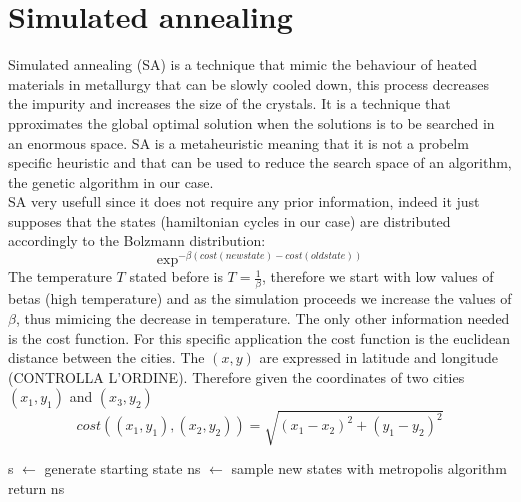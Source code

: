\documentclass{article}
\begin{document}
\section{Simulated annealing}
Simulated annealing (SA) is a technique that mimic the behaviour of heated materials in metallurgy that can be slowly cooled down, this process decreases the impurity and increases the size of the crystals. It is a technique that pproximates the global optimal solution when the solutions is to be searched in an enormous space. SA is a metaheuristic meaning that it is not a probelm specific heuristic and that can be used to reduce the search space of an algorithm, the genetic algorithm in our case.\\
SA very usefull since it does not require any prior information, indeed it just supposes that the states (hamiltonian cycles in our case) are distributed accordingly to the Bolzmann distribution:
\begin{equation}
\exp^{- \beta (cost(new state) - cost(old state))}
\end{equation}
The temperature $T$ stated before is $T = \frac{1}{\beta}$, therefore we start with low values of betas (high temperature) and as the simulation proceeds we increase the values of $\beta$, thus mimicing the decrease in temperature.
The only other information needed is the cost function. For this specific application the cost function is the euclidean distance between the cities. The $(x,y)$ are expressed in latitude and longitude (CONTROLLA L'ORDINE). Therefore given the coordinates of two cities  $(x_1,y_1)$ and $(x_3,y_2)$
\begin{equation}
cost((x_1,y_1),(x_2,y_2)) = \sqrt{(x_1-x_2)^2 + (y_1-y_2)^2}
\end{equation}

\begin{algorithm}[h]
    \begin{algorithmic}[1]
        \State s $\leftarrow$ generate starting state
         	\State ns  $\leftarrow$ sample new states with metropolis algorithm
         	\EndFor
        \EndFor
        \State return ns
       \EndFunction
\end{algorithmic}
\end{algorithm}
\end{document}
